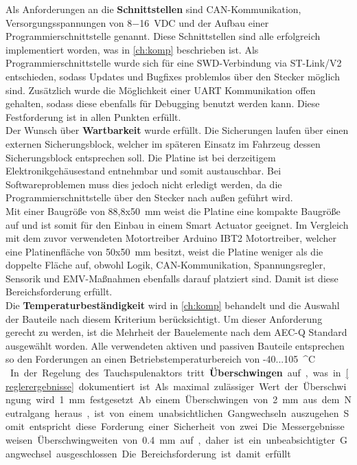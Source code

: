 Als Anforderungen an die \textbf{Schnittstellen} sind CAN-Kommunikation, Versorgungsspannungen von \SI{8-16}{VDC} und der Aufbau einer Programmierschnittstelle genannt. Diese Schnittstellen sind alle erfolgreich implementiert worden, was in \autoref{ch:komp} beschrieben ist. Als Programmierschnittstelle wurde sich für eine SWD-Verbindung via ST-Link/V2 entschieden, sodass Updates und Bugfixes problemlos über den Stecker möglich sind. Zusätzlich wurde die Möglichkeit einer UART Kommunikation offen gehalten, sodass diese ebenfalls für Debugging benutzt werden kann. Diese Festforderung ist in allen Punkten erfüllt.\\
Der Wunsch über \textbf{Wartbarkeit} wurde erfüllt. Die Sicherungen laufen über einen externen Sicherungsblock, welcher im späteren Einsatz im Fahrzeug dessen Sicherungsblock entsprechen soll. Die Platine ist bei derzeitigem Elektronikgehäusestand entnehmbar und somit austauschbar. Bei Softwareproblemen muss dies jedoch nicht erledigt werden, da die Programmierschnittstelle über den Stecker nach außen geführt wird. \\
Mit einer Baugröße von 88,8x\SI{50}{mm} weist die Platine eine kompakte Baugröße auf und ist somit für den Einbau in einem Smart Actuator geeignet. Im Vergleich mit dem zuvor verwendeten Motortreiber Arduino IBT2 Motortreiber, welcher eine Platinenfläche von 50x\SI{50}{mm} besitzt, weist die Platine weniger als die doppelte Fläche auf, obwohl Logik, CAN-Kommunikation, Spannungsregler, Sensorik und EMV-Maßnahmen ebenfalls darauf platziert sind. Damit ist diese Bereichsforderung erfüllt. \\
Die \textbf{Temperaturbeständigkeit} wird in \autoref{ch:komp} behandelt und die Auswahl der Bauteile nach diesem Kriterium berücksichtigt. Um dieser Anforderung gerecht zu werden, ist die Mehrheit der Bauelemente nach dem AEC-Q Standard ausgewählt worden. Alle verwendeten aktiven und passiven Bauteile entsprechen so den Forderungen an einen Betriebstemperaturbereich von -40...\SI{105}{^\circ C}.\\
In der Regelung des Tauchspulenaktors tritt \textbf{Überschwingen} auf, was in \autoref{reglerergebnisse} dokumentiert ist. Als maximal zulässiger Wert der Überschwingung wird \SI{1}{mm} festgesetzt. Ab einem Überschwingen von \SI{2}{mm} aus dem Neutralgang heraus, ist von einem unabsichtlichen Gangwechseln auszugehen. Somit entspricht diese Forderung einer Sicherheit von zwei. Die Messergebnisse weisen Überschwingweiten von \SI{0,4}{mm} auf, daher ist ein unbeabsichtigter Gangwechsel ausgeschlossen. Die Bereichsforderung ist damit erfüllt.\\
